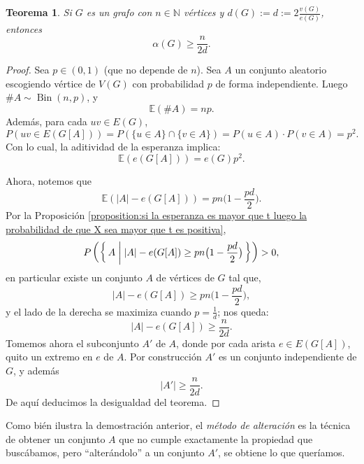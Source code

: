 \documentclass[12pt]{report}
\theoremstyle{plain}
\newtheorem{theorem}{Teorema}[section]
\theoremstyle{definition}
\newcommand{\naturals}{\mathbb{N}}
\newcommand{\abs}[1]{\left \vert #1 \right \vert}
\begin{document}
\begin{theorem}
Si $G$ es un grafo con $n \in \naturals$ vértices y $d(G) := d := 2 \frac{v(G)}{e(G)}$, entonces
\[
    \alpha (G) \geq \frac{n}{2 d}.
\]
\end{theorem}
\begin{proof}
Sea $p \in (0,1)$ (que no depende de $n$). Sea $A$ un conjunto aleatorio escogiendo vértice de $V(G)$ con probabilidad $p$ de forma independiente. Luego $\#A \sim \operatorname{Bin} (n,p)$, y
\[
    \mathbb{E}(\#A) = np.
\]
Además, para cada $uv \in E (G)$,
\[
    P (uv \in E(G[A])) = P(\{u \in A\} \cap \{v \in A\}) = P (u \in A) \cdot P (v \in A) = p^2.
\]
Con lo cual, la aditividad de la esperanza implica:
\[
    \mathbb{E} (e (G[A])) = e(G) p^2.
\]

Ahora, notemos que
\[
    \mathbb{E}(\abs A - e(G[A])) = pn \big(1 - \frac {pd}2 \big).
\]
Por la Proposición \ref{proposition:si la esperanza es mayor que t luego la probabilidad de que X sea mayor que t es positiva},
\[
    P \left (\Set {A | \abs{A} - e(G[A]  ) \geq p n \big ( 1 - \frac {pd}{2} \big ) } \right ) > 0,
\]
en particular existe un conjunto $A$ de vértices de $G$ tal que,
\[
    \abs A - e(G[A]) \geq pn \Big (1 - \frac{pd}2 \Big),
\]
y el lado de la derecha se maximiza cuando $p = \frac 1 d$; nos queda:
\[
    \abs A - e(G[A]) \geq \frac{n}{2d}.
\]
Tomemos ahora el subconjunto $A'$ de $A$, donde por cada arista $e \in E(G[A])$, quito un extremo en $e$ de $A$. Por construcción $A'$ es un conjunto independiente de $G$, y además
\[
    \abs{A'} \geq \frac{n}{2d}.
\]
De aquí deducimos la desigualdad del teorema.
\end{proof}

Como bién ilustra la demostración anterior, el \textit{método de alteración} es la técnica de obtener un conjunto $A$ que no cumple exactamente la propiedad que buscábamos, pero ``alterándolo'' a un conjunto $A'$, se obtiene lo que queríamos.
\end{document}
